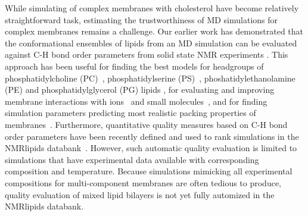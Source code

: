 \documentclass[journal=jctcce]{achemso}
\begin{document}
While simulating of complex membranes with cholesterol have become relatively straightforward task, estimating the trustworthiness of MD simulations for complex membranes remains a challenge.
%
Our earlier work has demonstrated that the conformational ensembles of lipids from an MD simulation can be evaluated against C-H bond order parameters from solid state NMR experiments \cite{botan15,ollila16,catte2016molecular,antila2019headgroup,bacle2021inverse}. 
This approach has been useful for finding the best models for headgroups of phosphatidylcholine (PC)~\cite{botan15}, phosphatidylserine (PS)~\cite{antila2019headgroup}, phoshatidylethanolamine (PE) \cite{bacle2021inverse} and phosphatidylglycerol (PG) lipids \cite{bacle2021inverse}, for evaluating and improving membrane interactions with ions~\cite{catte2016molecular,antila2019headgroup,bacle2021inverse,melcr18,melcr19} and small molecules~\cite{nencini22}, and for finding simulation parameters predicting most realistic packing properties of membranes~\cite{antila2022emerging,NMRlipidsDatabank}. Furthermore, quantitative quality measures based on C-H bond order parameters have been recently defined and used to rank simulations in the NMRlipids databank~\cite{NMRlipidsDatabank}. However, such automatic quality evaluation is limited to simulations that have experimental data available with corresponding composition and temperature. 
Because simulations mimicking all experimental compositions for multi-component membranes are often tedious to produce, quality evaluation of mixed lipid bilayers is not yet fully automized in the NMRlipids databank. 
\end{document}
